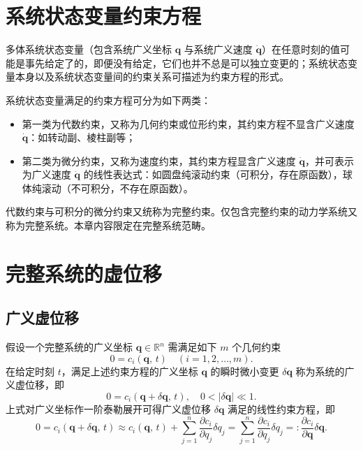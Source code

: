 \section{系统状态变量约束方程}

多体系统状态变量（包含系统广义坐标 $\boldsymbol{q}$ 与系统广义速度 $\dot{\boldsymbol{q}}$）在任意时刻的值可能是事先给定了的，即便没有给定，它们也并不总是可以独立变更的；系统状态变量本身以及系统状态变量间的约束关系可描述为约束方程的形式。

系统状态变量满足的约束方程可分为如下两类：
\begin{itemize}
\item 第一类为代数约束，又称为几何约束或位形约束，其约束方程不显含广义速度 $\dot{\boldsymbol{q}}$：如转动副、棱柱副等；
\item 第二类为微分约束，又称为速度约束，其约束方程显含广义速度 $\dot{\boldsymbol{q}}$，并可表示为广义速度 $\dot{\boldsymbol{q}}$ 的线性表达式：如圆盘纯滚动约束（可积分，存在原函数），球体纯滚动（不可积分，不存在原函数）。
\end{itemize}
代数约束与可积分的微分约束又统称为完整约束。仅包含完整约束的动力学系统又称为完整系统。本章内容限定在完整系统范畴。

\section{完整系统的虚位移}

\subsection{广义虚位移}

假设一个完整系统的广义坐标 $\boldsymbol{q} \in \mathbb{R}^n$ 需满足如下 $m$ 个几何约束
\begin{equation*}
0 = c_i(\boldsymbol{q},\, t) \quad (i = 1, 2, \ldots, m).
\end{equation*}
在给定时刻 $t$，满足上述约束方程的广义坐标 $\boldsymbol{q}$ 的瞬时微小变更 $\delta\boldsymbol{q}$ 称为系统的广义虚位移，即
\begin{equation*}
0 = c_i(\boldsymbol{q} + \delta\boldsymbol{q},\, t), \quad 0 < |\delta\boldsymbol{q}| \ll 1.
\end{equation*}
上式对广义坐标作一阶泰勒展开可得广义虚位移 $\delta\boldsymbol{q}$ 满足的线性约束方程，即
\begin{equation*}
0 = c_i(\boldsymbol{q} + \delta\boldsymbol{q},\, t) \approx c_i(\boldsymbol{q},\, t) + \sum_{j=1}^{n} \frac{\partial c_i}{\partial q_j} \delta q_j = \sum_{j=1}^{n} \frac{\partial c_i}{\partial q_j} \delta q_j =: \frac{\partial c_i}{\partial \boldsymbol{q}} \delta\boldsymbol{q}.
\end{equation*}

